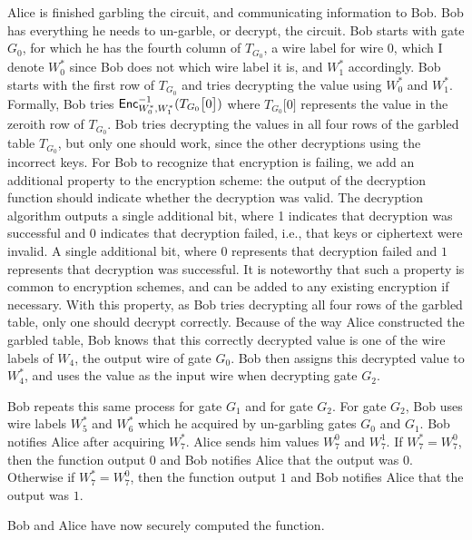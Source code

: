 Alice is finished garbling the circuit, and communicating information to Bob. 
Bob has everything he needs to un-garble, or decrypt, the circuit.
Bob starts with gate $G_0$, for which he has the fourth column of $T_{G_0}$, a wire label for wire $0$, which I denote $W_0^*$ since Bob does not which wire label it is, and $W_1^*$ accordingly.
Bob starts with the first row of $T_{G_0}$ and tries decrypting the value using $W_0^*$ and $W_1^*$.
Formally, Bob tries $\textsf{Enc}^{-1}_{W_0^*, W_1^*}(T_{G_0}\big[0\big])$ where $T_{G_0}\big[0\big]$ represents the value in the zeroith row of $T_{G_0}$.
Bob tries decrypting the values in all four rows of the garbled table $T_{G_0}$, but only one should work, since the other decryptions using the incorrect keys.
For Bob to recognize that encryption is failing, we add an additional property to the encryption scheme: the output of the decryption function should indicate whether the decryption was valid.
The decryption algorithm outputs a single additional bit, where 1 indicates that decryption was successful and 0 indicates that decryption failed, i.e., that keys or ciphertext were invalid.
A single additional bit, where $0$ represents that decryption failed and $1$ represents that decryption was successful. 
It is noteworthy that such a property is common to encryption schemes, and can be added to any existing encryption if necessary.
With this property, as Bob tries decrypting all four rows of the garbled table, only one should decrypt correctly.
Because of the way Alice constructed the garbled table, Bob knows that this correctly decrypted value is one of the wire labels of $W_4$, the output wire of gate $G_0$.
Bob then assigns this decrypted value to $W_4^*$, and uses the value as the input wire when decrypting gate $G_2$.

Bob repeats this same process for gate $G_1$ and for gate $G_2$.
For gate $G_2$, Bob uses wire labels $W_5^*$ and $W_6^*$ which he acquired by un-garbling gates $G_0$ and $G_1$.
Bob notifies Alice after acquiring $W_7^*$.
Alice sends him values $W_7^0$ and $W_7^1$.
If $W_7^* = W_7^0$, then the function output $0$ and Bob notifies Alice that the output was $0$.
Otherwise if $W_7^* = W_7^0$, then the function output $1$ and Bob notifies Alice that the output was $1$.

Bob and Alice have now securely computed the function.


